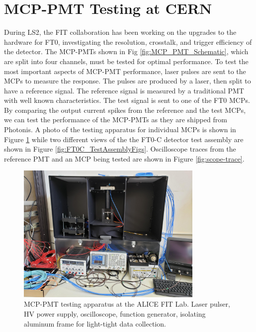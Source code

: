 \section{MCP-PMT Testing at CERN}\label{pmt_testing}
During LS2, the FIT collaboration has been working on the upgrades to the hardware for FT0, investigating the resolution, crosstalk, and trigger efficiency of the detector. The MCP-PMTs shown in Fig \ref{fig:MCP_PMT_Schematic}, which are split into four channels, must be tested for optimal performance. To test the most important aspects of MCP-PMT performance, laser pulses are sent to the MCPs to measure the response. The pulses are produced by a laser, then split to have a reference signal. The reference signal is measured by a traditional PMT with well known characteristics. The test signal is sent to one of the FT0 MCPs. By comparing the output current spikes from the reference and the test MCPs, we can test the performance of the MCP-PMTs as they are shipped from Photonis. A photo of the testing apparatus for individual MCPs is shown in Figure \ref{fig:PMT_Testing_Apparatus} while two different views of the the FT0-C detector test assembly are shown in Figure \ref{fig:FT0C_TestAssemblyFigs}. Oscilloscope traces from the reference PMT and an MCP being tested are shown in Figure \ref{fig:scope-trace}.


\begin{figure}[H]
    \centering
    \includegraphics[width=0.8\textwidth]{figures/FIT/PMT_Test_apparatus.jpg}
    \caption{MCP-PMT testing apparatus at the ALICE FIT Lab. Laser pulser, HV power supply, oscilloscope, function generator, isolating aluminum frame for light-tight data collection.}
    \label{fig:PMT_Testing_Apparatus}
\end{figure}


